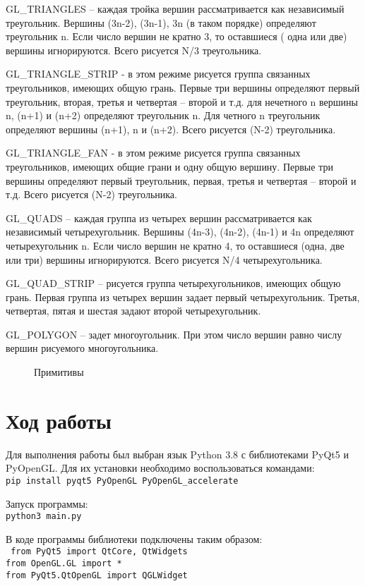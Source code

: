 GL\_TRIANGLES – каждая тройка вершин рассматривается как независимый треугольник.
Вершины (3n-2), (3n-1), 3n (в таком порядке) определяют треугольник n.
Если число вершин не кратно 3, то оставшиеся ( одна или две) вершины игнорируются.
Всего рисуется N/3 треугольника.

GL\_TRIANGLE\_STRIP - в этом режиме рисуется группа связанных треугольников, имеющих общую грань.
Первые три вершины определяют первый треугольник, вторая, третья и четвертая – второй и т.д. для нечетного n вершины n, (n+1) и (n+2) определяют треугольник n.
Для четного n треугольник определяют вершины (n+1), n и (n+2).
Всего рисуется (N-2) треугольника.

GL\_TRIANGLE\_FAN - в этом режиме рисуется группа связанных треугольников, имеющих общие грани и одну общую вершину.
Первые три вершины определяют первый треугольник, первая, третья и четвертая – второй и т.д. Всего рисуется (N-2) треугольника.

GL\_QUADS – каждая группа из четырех вершин рассматривается как независимый четырехугольник.
Вершины (4n-3), (4n-2), (4n-1) и 4n определяют четырехугольник n.
Если число вершин не кратно 4, то оставшиеся (одна, две или три) вершины игнорируются.
Всего рисуется N/4 четырехугольника.

GL\_QUAD\_STRIP – рисуется группа четырехугольников, имеющих общую грань.
Первая группа из четырех вершин задает первый четырехугольник.
Третья, четвертая, пятая и шестая задают второй четырехугольник.

GL\_POLYGON – задет многоугольник.
При этом число вершин равно числу вершин рисуемого многоугольника.

\begin{figure}[h]
    \center{\texttt{[image: 1]}}
    \caption{Примитивы}
    \label{fig:1}
\end{figure}

\section*{Ход работы}
Для выполнения работы был выбран язык Python 3.8 с библиотеками PyQt5 и PyOpenGL.
Для их установки необходимо воспользоваться командами:\\
\texttt{pip install pyqt5 PyOpenGL PyOpenGL\_accelerate}

Запуск программы:\\
\texttt{python3 main.py}

В коде программы библиотеки подключены таким образом:\\
\texttt{
    from PyQt5 import QtCore, QtWidgets \\
    from OpenGL.GL import * \\
    from PyQt5.QtOpenGL import QGLWidget
}

